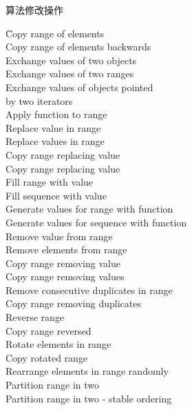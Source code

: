 \begin{frame}{算法}{修改操作}
  \begin{tabbing}
     \hspace{6em} \= Copy range of elements\\
     \> Copy range of elements backwards\\ 
     \> Exchange values of two objects\\ 
     \> Exchange values of two ranges\\ 
     \> Exchange values of objects pointed \\
                                      \> by two iterators\\ 
     \> Apply function to range\\ 
     \> Replace value in range\\ 
     \> Replace values in range\\
     \> Copy range replacing value\\
     \> Copy range replacing value\\ 
     \> Fill range with value\\ 
     \> Fill sequence with value\\ 
     \> Generate values for range with function\\ 
     \> Generate values for sequence with function\\
     \> Remove value from range\\ 
     \> Remove elements from range\\ 
     \> Copy range removing value\\ 
     \> Copy range removing values\\ 
     \> Remove consecutive duplicates in range\\ 
     \> Copy range removing duplicates\\ 
     \> Reverse range\\ 
     \> Copy range reversed\\
     \> Rotate elements in range\\ 
     \> Copy rotated range\\ 
     \> Rearrange elements in range randomly\\ 
     \> Partition range in two\\ 
     \> Partition range in two - stable ordering 
  \end{tabbing}
\end{frame}

